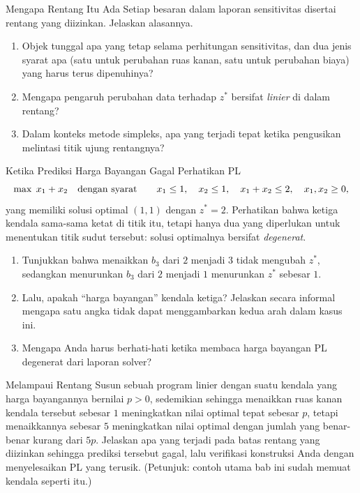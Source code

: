 \begin{ex}{Mengapa Rentang Itu Ada}{}
 Setiap besaran dalam laporan sensitivitas disertai rentang yang diizinkan. Jelaskan alasannya.
\begin{enumerate}
\item Objek tunggal apa yang tetap selama perhitungan sensitivitas, dan dua jenis syarat apa (satu untuk perubahan ruas kanan, satu untuk perubahan biaya) yang harus terus dipenuhinya?
\item Mengapa pengaruh perubahan data terhadap $z^*$ bersifat \emph{linier} di dalam rentang?
\item Dalam konteks metode simpleks, apa yang terjadi tepat ketika pengusikan melintasi titik ujung rentangnya?
\end{enumerate}
\exrefs{\S\ref{sec:sensitivity-overview}, \S\ref{sec:sensitivity-rhs}, \S\ref{sec:sensitivity-cost}}
\end{ex}

\begin{ex}{Ketika Prediksi Harga Bayangan Gagal}{}
 Perhatikan PL
\[
\max \; x_1 + x_2 \quad \mbox{dengan syarat}\quad \quad x_1 \leq 1, \quad x_2 \leq 1, \quad x_1 + x_2 \leq 2, \quad x_1, x_2 \geq 0,
\]
yang memiliki solusi optimal $(1,1)$ dengan $z^* = 2$. Perhatikan bahwa ketiga kendala sama-sama ketat di titik itu, tetapi hanya dua yang diperlukan untuk menentukan titik sudut tersebut: solusi optimalnya bersifat \emph{degenerat}.
\begin{enumerate}
\item Tunjukkan bahwa menaikkan $b_3$ dari $2$ menjadi $3$ tidak mengubah $z^*$, sedangkan menurunkan $b_3$ dari $2$ menjadi $1$ menurunkan $z^*$ sebesar $1$.
\item Lalu, apakah ``harga bayangan'' kendala ketiga? Jelaskan secara informal mengapa satu angka tidak dapat menggambarkan kedua arah dalam kasus ini.
\item Mengapa Anda harus berhati-hati ketika membaca harga bayangan PL degenerat dari laporan solver?
\end{enumerate}
\exrefs{\S\ref{sec:sensitivity-rhs}, \S\ref{sec:sensitivity-software}}
\end{ex}


\begin{ex}{Melampaui Rentang}{}
\label{ex:sensitivity-range-boundary}
 Susun sebuah program linier dengan suatu kendala yang harga bayangannya bernilai $p > 0$, sedemikian sehingga menaikkan ruas kanan kendala tersebut sebesar $1$ meningkatkan nilai optimal tepat sebesar $p$, tetapi menaikkannya sebesar $5$ meningkatkan nilai optimal dengan jumlah yang benar-benar kurang dari $5p$. Jelaskan apa yang terjadi pada batas rentang yang diizinkan sehingga prediksi tersebut gagal, lalu verifikasi konstruksi Anda dengan menyelesaikan PL yang terusik. (Petunjuk: contoh utama bab ini sudah memuat kendala seperti itu.)
\exrefs{\S\ref{sec:sensitivity-rhs}, \S\ref{sec:sensitivity-overview}}
\end{ex}

